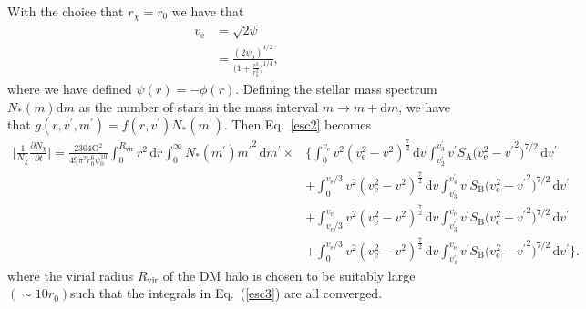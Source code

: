 \documentclass[aps,floatfix,prd,showpacs]{revtex4}
\newcommand{\diff}{\mathrm{d}}
\newcommand{\vesc}{v_{\text{e}}}
\newcommand{\vp}{v^\prime}
\newcommand{\mpr}{m^\prime}
\newcommand{\SA}{S_{\text{A}}}
\newcommand{\SB}{S_{\text{B}}}
\newcommand{\G}{\text{G}}
\newcommand{\rx}{r_\chi}
\newcommand{\Nx}{N_\chi}
\newcommand{\Rvir}{R_{\mathrm{vir}}}
\begin{document}
With the choice that $\rx = r_0$ we have that 
%
\begin{equation}
	\begin{split}
	\vesc &= \sqrt{2\psi} \\
		&= \frac{(2\psi_0)^{1/2}}{\big(1+\frac{r^2}{r_0^2}\big)^{1/4}},
	\end{split}
\end{equation}
%
%
where we have defined $\psi(r) = -\phi(r)$.  Defining the stellar mass spectrum $N_*(m)\diff m$ as the number of stars in the mass interval $m \rightarrow m+\diff m$, we have that $g(r,\vp,\mpr) = f(r,\vp)N_*(\mpr)$.  Then Eq.~\ref{esc2} becomes
%
\begin{equation}
\label{esc3}
\begin{split}
\bigg|\frac{1}{\Nx}\frac{\partial \Nx}{\partial t}\bigg| = \frac{2304\G^2}{49\pi^2 r_0^6\psi_0^{10}}\int^{\Rvir}_0{r^2}\,\diff r\int^\infty_0{N_*(\mpr)\mpr}^2\,\diff \mpr \times &\Bigg\{ \int^{\vesc}_0{v^2(\vesc^2 - {v}^2)^\frac{7}{2}}\,\diff v\int^{\vp_3}_{\vp_2}{\vp \SA{(\vesc^2-{\vp}^2})^{7/2}}\,\diff \vp \\
&+ \int^{\vesc/3}_0{v^2(\vesc^2 - {v}^2)^\frac{7}{2}}\,\diff v\int^{\vp_4}_{\vp_3}{\vp \SB{(\vesc^2-{\vp}^2})^{7/2}}\,\diff \vp \\ &+ \int^{\vesc}_{\vesc/3}{v^2(\vesc^2 - {v}^2)^\frac{7}{2}}\,\diff v\int^{\vesc}_{\vp_3}{\vp \SB{(\vesc^2-{\vp}^2})^{7/2}}\,\diff \vp \\
&+ \int^{\vesc/3}_0{v^2(\vesc^2 - {v}^2)^\frac{7}{2}}\,\diff v\int^{\vesc}_{\vp_4}{\vp \SB{(\vesc^2-{\vp}^2})^{7/2}}\,\diff \vp\Bigg\}.
\end{split}
\end{equation}
%
%
where the virial radius $\Rvir$ of the DM halo is chosen to be suitably large $(\sim 10r_0)$such that the integrals in Eq.~(\ref{esc3}) are all converged.  
\end{document}

